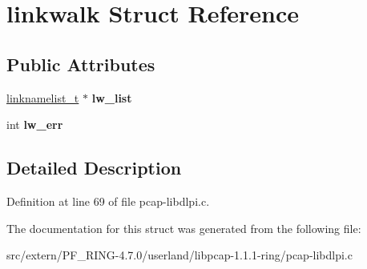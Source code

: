 \hypertarget{structlinkwalk}{
\section{linkwalk Struct Reference}
\label{structlinkwalk}
}
\subsection*{Public Attributes}
\begin{DoxyCompactItemize}
\item 
\hypertarget{structlinkwalk_adb56d16f1765b52a87c11b1b52509e5e}{
\hyperlink{structlinknamelist}{linknamelist\_\-t} $\ast$ {\bfseries lw\_\-list}}
\label{structlinkwalk_adb56d16f1765b52a87c11b1b52509e5e}

\item 
\hypertarget{structlinkwalk_a7b8cc1cd98aabf05966ce23316c6002f}{
int {\bfseries lw\_\-err}}
\label{structlinkwalk_a7b8cc1cd98aabf05966ce23316c6002f}

\end{DoxyCompactItemize}


\subsection{Detailed Description}


Definition at line 69 of file pcap-\/libdlpi.c.



The documentation for this struct was generated from the following file:\begin{DoxyCompactItemize}
\item 
src/extern/PF\_\-RING-\/4.7.0/userland/libpcap-\/1.1.1-\/ring/pcap-\/libdlpi.c\end{DoxyCompactItemize}
